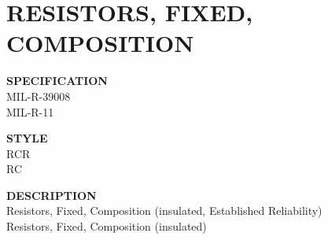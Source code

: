 \section{RESISTORS, FIXED, COMPOSITION}

\begin{minipage}[t]{0.24\textwidth}
    \textbf{SPECIFICATION}\\
    MIL-R-39008\\
    MIL-R-11
\end{minipage}
\begin{minipage}[t]{0.12\textwidth}
    \textbf{STYLE}\\
    RCR\\
    RC
\end{minipage}
\begin{minipage}[t]{0.6\textwidth}
    \textbf{DESCRIPTION}\\
    {\fontsize{12pt}{12pt}\selectfont Resistors, Fixed, Composition (insulated, Established Reliability)\\Resistors, Fixed, Composition (insulated)}
\end{minipage}

